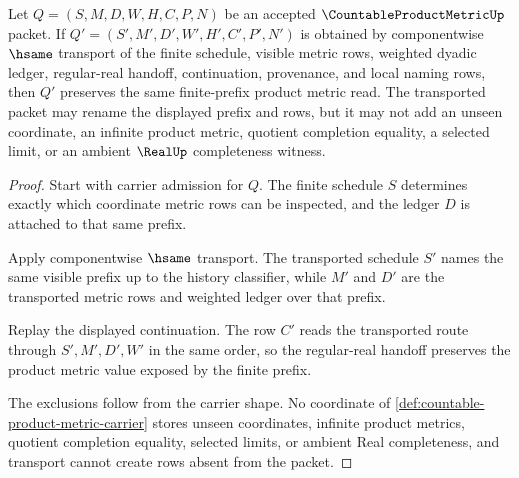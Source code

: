\begin{theorem}
\label{thm:countable-product-metric-finite-prefix-stability}
Let $Q=(S,M,D,W,H,C,P,N)$ be an accepted $\CountableProductMetricUp$ packet. If $Q'=(S',M',D',W',H',C',P',N')$ is obtained by componentwise $\hsame$ transport of the finite schedule, visible metric rows, weighted dyadic ledger, regular-real handoff, continuation, provenance, and local naming rows, then $Q'$ preserves the same finite-prefix product metric read. The transported packet may rename the displayed prefix and rows, but it may not add an unseen coordinate, an infinite product metric, quotient completion equality, a selected limit, or an ambient $\RealUp$ completeness witness.
\end{theorem}
\begin{proof}
Start with carrier admission for $Q$. The finite schedule $S$ determines exactly which coordinate metric rows can be inspected, and the ledger $D$ is attached to that same prefix.

Apply componentwise $\hsame$ transport. The transported schedule $S'$ names the same visible prefix up to the history classifier, while $M'$ and $D'$ are the transported metric rows and weighted ledger over that prefix.

Replay the displayed continuation. The row $C'$ reads the transported route through $S',M',D',W'$ in the same order, so the regular-real handoff preserves the product metric value exposed by the finite prefix.

The exclusions follow from the carrier shape. No coordinate of \autoref{def:countable-product-metric-carrier} stores unseen coordinates, infinite product metrics, quotient completion equality, selected limits, or ambient Real completeness, and transport cannot create rows absent from the packet.
\end{proof}

